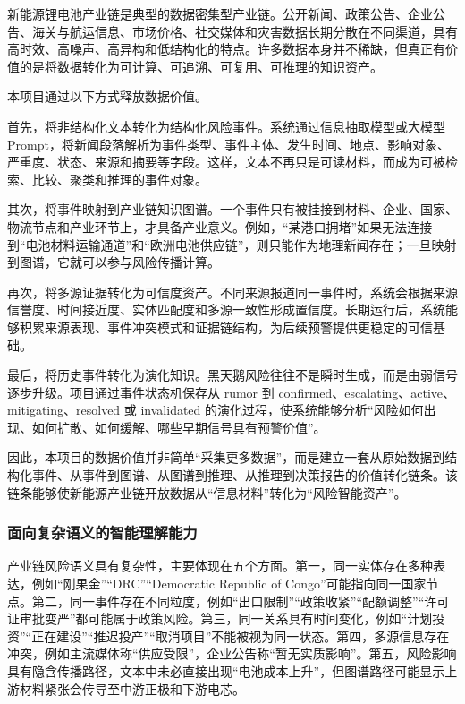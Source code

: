 \documentclass[12pt,a4paper]{article}
\begin{document}
新能源锂电池产业链是典型的数据密集型产业链。公开新闻、政策公告、企业公告、海关与航运信息、市场价格、社交媒体和灾害数据长期分散在不同渠道，具有高时效、高噪声、高异构和低结构化的特点。许多数据本身并不稀缺，但真正有价值的是将数据转化为可计算、可追溯、可复用、可推理的知识资产。

本项目通过以下方式释放数据价值。

首先，将非结构化文本转化为结构化风险事件。系统通过信息抽取模型或大模型 Prompt，将新闻段落解析为事件类型、事件主体、发生时间、地点、影响对象、严重度、状态、来源和摘要等字段。这样，文本不再只是可读材料，而成为可被检索、比较、聚类和推理的事件对象。

其次，将事件映射到产业链知识图谱。一个事件只有被挂接到材料、企业、国家、物流节点和产业环节上，才具备产业意义。例如，“某港口拥堵”如果无法连接到“电池材料运输通道”和“欧洲电池供应链”，则只能作为地理新闻存在；一旦映射到图谱，它就可以参与风险传播计算。

再次，将多源证据转化为可信度资产。不同来源报道同一事件时，系统会根据来源信誉度、时间接近度、实体匹配度和多源一致性形成置信度。长期运行后，系统能够积累来源表现、事件冲突模式和证据链结构，为后续预警提供更稳定的可信基础。

最后，将历史事件转化为演化知识。黑天鹅风险往往不是瞬时生成，而是由弱信号逐步升级。项目通过事件状态机保存从 rumor 到 confirmed、escalating、active、mitigating、resolved 或 invalidated 的演化过程，使系统能够分析“风险如何出现、如何扩散、如何缓解、哪些早期信号具有预警价值”。

因此，本项目的数据价值并非简单“采集更多数据”，而是建立一套从原始数据到结构化事件、从事件到图谱、从图谱到推理、从推理到决策报告的价值转化链条。该链条能够使新能源产业链开放数据从“信息材料”转化为“风险智能资产”。

\subsubsection{面向复杂语义的智能理解能力}

产业链风险语义具有复杂性，主要体现在五个方面。第一，同一实体存在多种表达，例如“刚果金”“DRC”“Democratic Republic of Congo”可能指向同一国家节点。第二，同一事件存在不同粒度，例如“出口限制”“政策收紧”“配额调整”“许可证审批变严”都可能属于政策风险。第三，同一关系具有时间变化，例如“计划投资”“正在建设”“推迟投产”“取消项目”不能被视为同一状态。第四，多源信息存在冲突，例如主流媒体称“供应受限”，企业公告称“暂无实质影响”。第五，风险影响具有隐含传播路径，文本中未必直接出现“电池成本上升”，但图谱路径可能显示上游材料紧张会传导至中游正极和下游电芯。
\end{document}
